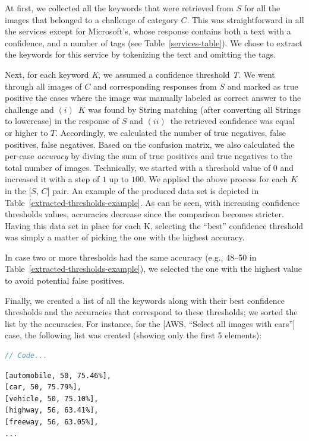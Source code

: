 \documentclass[sigconf,review,anonymous]{acmart}
\begin{document}
At first, we collected all the keywords that were retrieved from $S$ for all the images that belonged to a challenge of category $C$. This was straightforward in all the services except for Microsoft's, whose response contains both a text with a confidence, and a number of tags (see Table~\ref{services-table}). We chose to extract the keywords for this service by tokenizing the text and omitting the tags. 

Next, for each keyword \textit{K}, we assumed a confidence threshold \textit{T}. We went through all images of $C$ and corresponding responses from $S$ and marked as true positive the cases where the image was manually labeled as correct answer to the challenge and $(i)$~$K$ was found by String matching (after converting all Strings to lowercase) in the response of $S$ and $(ii)$~the retrieved confidence was equal or higher to $T$. Accordingly, we calculated the number of true negatives, false positives, false negatives. Based on the confusion matrix, we also calculated the per-case \textit{accuracy} by diving the sum of true positives and true negatives to the total number of images. 
Technically, we started with a threshold value of $0$ and increased it with a step of $1$ up to $100$. We applied the above process for each $K$ in the [$S$, $C$] pair. An example of the produced data set is depicted in Table~\ref{extracted-thresholds-example}. As can be seen, with increasing confidence thresholds values, accuracies decrease since the comparison becomes stricter. Having this data set in place for each K, selecting the ``best'' confidence threshold was simply a matter of picking the one with the highest accuracy. 

In case two or more thresholds had the same accuracy (e.g., 48--50 in Table~\ref{extracted-thresholds-example}), we selected the one with the highest value to avoid potential false positives.

Finally, we created a list of all the keywords along with their best confidence thresholds and the accuracies that correspond to these thresholds; we sorted the list by the accuracies. For instance, for the [AWS, ``Select all images with cars''] case, the following list was created (showing only the first 5 elements):

\begin{lstlisting}[caption={Some Java code},label={lst:label},language=Java]
// Code...
\end{lstlisting}

\begin{lstlisting}[caption={Some Java code},label={lst:keywords},]
[automobile, 50, 75.46%],
[car, 50, 75.79%],
[vehicle, 50, 75.10%],
[highway, 56, 63.41%],
[freeway, 56, 63.05%],
...
\end{lstlisting}
\end{document}
